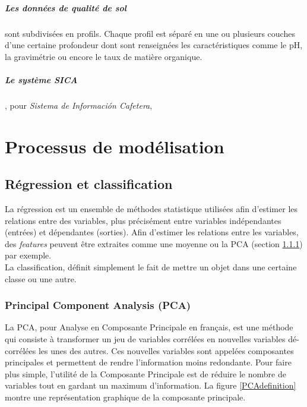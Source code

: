 \paragraph{Les données de qualité de sol}sont subdivisées en profils. Chaque profil est séparé en une ou plusieurs couches d’une certaine profondeur dont sont renseignées les caractéristiques comme le pH, la gravimétrie ou encore le taux de matière organique. 

\paragraph{Le système SICA}, pour \textit{Sistema de Información Cafetera}, 


\chapter{Processus de modélisation}
\section{Régression et classification}
La régression est un ensemble de méthodes statistique utilisées afin d'estimer les relations entre des variables, plus précisément entre variables indépendantes (entrées) et dépendantes (sorties). Afin d'estimer les relations entre les variables, des \textit{features} peuvent être extraites comme une moyenne ou la PCA (section \ref{PCAss}) par exemple.\\

La classification, définit simplement le fait de mettre un objet dans une certaine classe ou une autre. 






\subsection{Principal Component Analysis (PCA)}\label{PCAss}
La PCA, pour Analyse en Composante Principale en français, est une méthode qui consiste à transformer un jeu de variables corrélées en nouvelles variables dé-corrélées les unes des autres. Ces nouvelles variables sont appelées composantes principales et permettent de rendre l'information moins redondante. Pour faire plus simple, l'utilité de la Composante Principale est de réduire le nombre de variables tout en gardant un maximum d'information. La figure \ref{PCAdefinition} montre une représentation graphique de la composante principale. 


